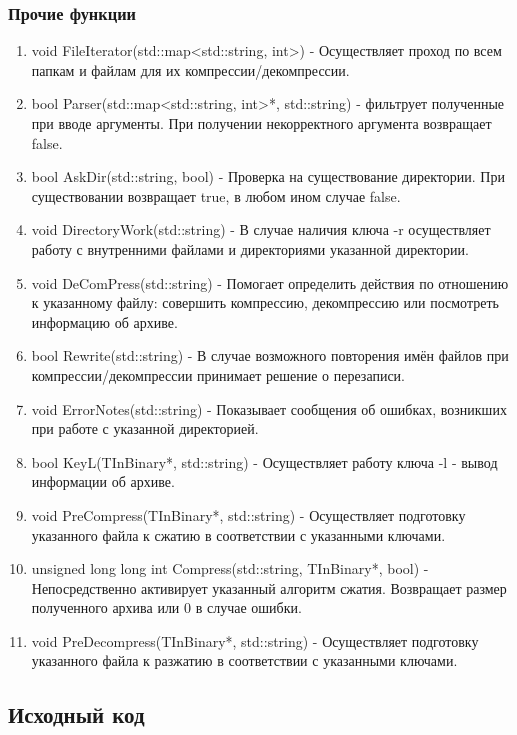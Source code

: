 \documentclass[12pt]{article}
\begin{document}
\subsubsection*{Прочие функции}
\noindent
\begin{enumerate} 
	\item void FileIterator(std::map<std::string, int>) - Осуществляет проход по всем папкам и файлам для их компрессии/декомпрессии.
	\item bool Parser(std::map<std::string, int>*, std::string) - фильтрует полученные при вводе аргументы. При получении некорректного аргумента возвращает false.
	\item bool AskDir(std::string, bool) - Проверка на существование директории. При существовании возвращает true, в любом ином случае false.
	\item void DirectoryWork(std::string) - В случае наличия ключа -r осуществляет работу с внутренними файлами и директориями указанной директории.
	\item void DeComPress(std::string) - Помогает определить действия по отношению к указанному файлу: совершить компрессию, декомпрессию или посмотреть информацию об архиве.
	\item bool Rewrite(std::string) - В случае возможного повторения имён файлов при компрессии/декомпрессии принимает решение о перезаписи.
	\item void ErrorNotes(std::string) - Показывает сообщения об ошибках, возникших при работе с указанной директорией.
	\item bool KeyL(TInBinary*, std::string) - Осуществляет работу ключа -l - вывод информации об архиве.
	\item void PreCompress(TInBinary*, std::string) - Осуществляет подготовку указанного файла к сжатию в соответствии с указанными ключами.
	\item unsigned long long int Compress(std::string, TInBinary*, bool) - Непосредственно активирует указанный алгоритм сжатия. Возвращает размер полученного архива или 0 в случае ошибки.
	\item void PreDecompress(TInBinary*, std::string) - Осуществляет подготовку указанного файла к разжатию в соответствии с указанными ключами.
\end{enumerate}

\subsection*{Исходный код}%
\end{document}
